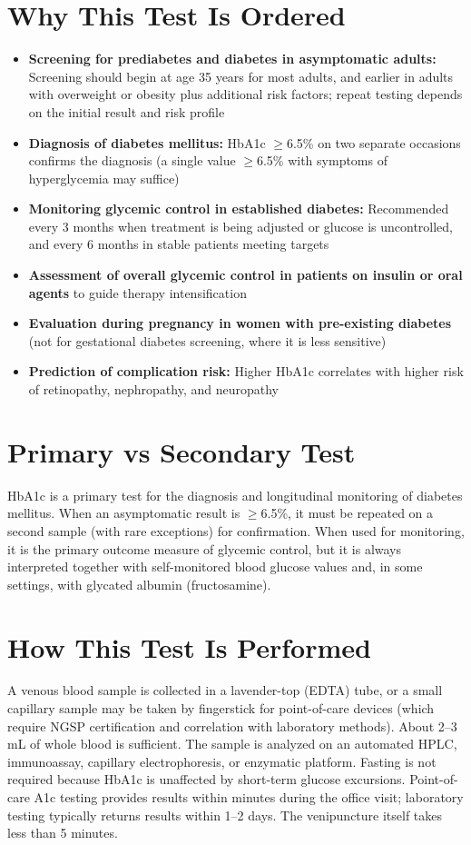\section*{Why This Test Is Ordered}
\begin{itemize}
  \item \textbf{Screening for prediabetes and diabetes in asymptomatic adults:} Screening should begin at age 35 years for most adults, and earlier in adults with overweight or obesity plus additional risk factors; repeat testing depends on the initial result and risk profile
  \item \textbf{Diagnosis of diabetes mellitus:} HbA1c $\geq$6.5\% on two separate occasions confirms the diagnosis (a single value $\geq$6.5\% with symptoms of hyperglycemia may suffice)
  \item \textbf{Monitoring glycemic control in established diabetes:} Recommended every 3 months when treatment is being adjusted or glucose is uncontrolled, and every 6 months in stable patients meeting targets
  \item \textbf{Assessment of overall glycemic control in patients on insulin or oral agents} to guide therapy intensification
  \item \textbf{Evaluation during pregnancy in women with pre-existing diabetes} (not for gestational diabetes screening, where it is less sensitive)
  \item \textbf{Prediction of complication risk:} Higher HbA1c correlates with higher risk of retinopathy, nephropathy, and neuropathy
\end{itemize}

\section*{Primary vs Secondary Test}
HbA1c is a primary test for the diagnosis and longitudinal monitoring of diabetes mellitus. When an asymptomatic result is $\geq$6.5\%, it must be repeated on a second sample (with rare exceptions) for confirmation. When used for monitoring, it is the primary outcome measure of glycemic control, but it is always interpreted together with self-monitored blood glucose values and, in some settings, with glycated albumin (fructosamine).

\section*{How This Test Is Performed}
A venous blood sample is collected in a lavender-top (EDTA) tube, or a small capillary sample may be taken by fingerstick for point-of-care devices (which require NGSP certification and correlation with laboratory methods). About 2--3 mL of whole blood is sufficient. The sample is analyzed on an automated HPLC, immunoassay, capillary electrophoresis, or enzymatic platform. Fasting is not required because HbA1c is unaffected by short-term glucose excursions. Point-of-care A1c testing provides results within minutes during the office visit; laboratory testing typically returns results within 1--2 days. The venipuncture itself takes less than 5 minutes.


